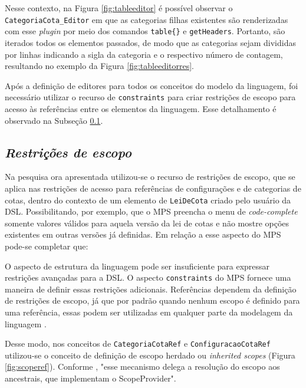 Nesse contexto, na Figura \ref{fig:tableeditor} é possível observar o \texttt{CategoriaCota\_Editor} em que as categorias filhas existentes são renderizadas com esse \textit{plugin} por meio dos comandos \texttt{table\{\}} e \texttt{getHeaders}. Portanto, são iterados todos os elementos passados, de modo que as categorias sejam divididas por linhas indicando a sigla da categoria e o respectivo número de contagem, resultando no exemplo da Figura \ref{fig:tableeditorres}.





\newpage
Após a definição de editores para todos os conceitos do modelo da linguagem, foi necessário utilizar o recurso de \texttt{constraints} para criar restrições de escopo para acesso às referências entre os elementos da linguagem. Esse detalhamento é observado na Subseção \ref{sub:sec:constraints}.

\subsection{\textit{Restrições de escopo}}
\label{sub:sec:constraints}

Na pesquisa ora apresentada utilizou-se o recurso de restrições de escopo, que se aplica nas restrições de acesso para referências de configurações e de categorias de cotas, dentro do contexto de um elemento de \texttt{LeiDeCota} criado pelo usuário da DSL. Possibilitando, por exemplo, que o \gls{MPS} preencha o menu de \textit{code-complete} somente valores válidos para aquela versão da lei de cotas e não mostre opções existentes em  outras versões já definidas. Em relação a esse aspecto do MPS pode-se completar que:
 
\begin{citacao}
O aspecto de estrutura da linguagem pode ser insuficiente para expressar restrições avançadas para a DSL. O aspecto \texttt{constraints} do MPS fornece uma maneira de definir essas restrições adicionais. Referências dependem da definição de restrições de escopo, já que por padrão quando nenhum escopo é definido para uma referência, essas podem ser utilizadas em qualquer parte da modelagem da linguagem \cite[s/p, tradução nossa]{jetbrains}.
\end{citacao}

Desse modo, nos conceitos de \texttt{CategoriaCotaRef} e \texttt{ConfiguracaoCotaRef} utilizou-se o conceito de definição de escopo herdado ou \textit{inherited scopes} (Figura \ref{fig:scoperef}). Conforme , "esse mecanismo delega a resolução do escopo aos ancestrais, que implementam o ScopeProvider".

